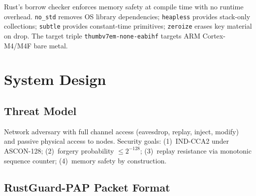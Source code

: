 \documentclass[anonymous]{ndss}
\newcommand{\nstd}{\texttt{no\_std}}
\begin{document}
Rust's borrow checker enforces memory safety at compile time with no runtime
overhead. \nstd{} removes OS library dependencies; \texttt{heapless} provides
stack-only collections; \texttt{subtle} provides constant-time primitives;
\texttt{zeroize} erases key material on drop. The target triple
\texttt{thumbv7em-none-eabihf} targets ARM Cortex-M4/M4F bare metal.

\section{System Design}
\label{sec:design}

\subsection{Threat Model}

Network adversary with full channel access (eavesdrop, replay, inject, modify)
and passive physical access to nodes. Security goals:
(1)~IND-CCA2 under ASCON-128;
(2)~forgery probability $\leq 2^{-128}$;
(3)~replay resistance via monotonic sequence counter;
(4)~memory safety by construction.

\subsection{RustGuard-PAP Packet Format}

\begin{table}[!t]
\centering
\caption{RustGuard-PAP Wire Format (40-byte fixed overhead)}
\label{tab:packet}
\renewcommand{\arraystretch}{1.15}
\footnotesize
{}
\end{table}
\end{document}
